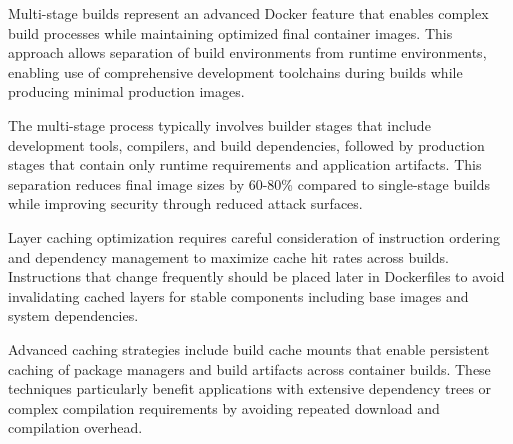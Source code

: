 Multi-stage builds represent an advanced Docker feature that enables complex build processes while maintaining optimized final container images. This approach allows separation of build environments from runtime environments, enabling use of comprehensive development toolchains during builds while producing minimal production images.

The multi-stage process typically involves builder stages that include development tools, compilers, and build dependencies, followed by production stages that contain only runtime requirements and application artifacts. This separation reduces final image sizes by 60-80\% compared to single-stage builds while improving security through reduced attack surfaces.

Layer caching optimization requires careful consideration of instruction ordering and dependency management to maximize cache hit rates across builds. Instructions that change frequently should be placed later in Dockerfiles to avoid invalidating cached layers for stable components including base images and system dependencies.

Advanced caching strategies include build cache mounts that enable persistent caching of package managers and build artifacts across container builds. These techniques particularly benefit applications with extensive dependency trees or complex compilation requirements by avoiding repeated download and compilation overhead.

